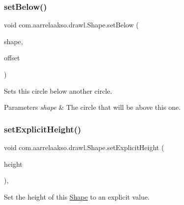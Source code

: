 \subsubsection{\texorpdfstring{set\+Below()}{setBelow()}\hspace{0.1cm}{\footnotesize\ttfamily [2/2]}}
{\footnotesize\ttfamily void com.\+aarrelaakso.\+drawl.\+Shape.\+set\+Below (\begin{DoxyParamCaption}\item[{@Not\+Null final \hyperlink{classcom_1_1aarrelaakso_1_1drawl_1_1_shape}{Shape}}]{shape,  }\item[{@Not\+Null final \hyperlink{classcom_1_1aarrelaakso_1_1drawl_1_1_measure}{Measure}}]{offset }\end{DoxyParamCaption})\hspace{0.3cm}{\ttfamily [inherited]}}



Sets this circle below another circle. 


\begin{DoxyParams}{Parameters}
{\em shape} & The circle that will be above this one. \\
\hline
\end{DoxyParams}
\mbox{\label{classcom_1_1aarrelaakso_1_1drawl_1_1_shape_a3680a63cef0d766132d1f64813ca8eca}} 
\subsubsection{\texorpdfstring{set\+Explicit\+Height()}{setExplicitHeight()}}
{\footnotesize\ttfamily void com.\+aarrelaakso.\+drawl.\+Shape.\+set\+Explicit\+Height (\begin{DoxyParamCaption}\item[{@Nullable final \hyperlink{interfacecom_1_1aarrelaakso_1_1drawl_1_1_number}{Number}}]{height }\end{DoxyParamCaption})\hspace{0.3cm}{\ttfamily [protected]}, {\ttfamily [inherited]}}



Set the height of this \hyperlink{classcom_1_1aarrelaakso_1_1drawl_1_1_shape}{Shape} to an explicit value. 



